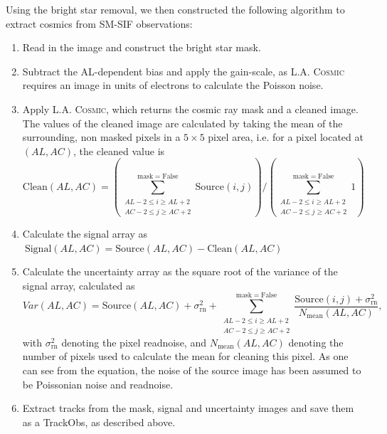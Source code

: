 \documentclass[a4paper, 11pt]{article}
\begin{document}
Using the bright star removal, we then constructed the following algorithm to extract cosmics from SM-SIF observations:
\begin{enumerate}
  \item Read in the image and construct the bright star mask.
  \item Subtract the AL-dependent bias and apply the gain-scale, as \textsc{L.A. Cosmic} requires an image in units of electrons to calculate the Poisson noise.
  \item Apply \textsc{L.A. Cosmic}, which returns the cosmic ray mask and a cleaned image. The values of the cleaned image are calculated by taking the mean of the surrounding, non masked pixels in a $5 \times 5$ pixel area, i.e. for a pixel located at $\left(AL,AC\right)$, the cleaned value is
    \begin{equation}
      \mathrm{Clean}\left(AL,AC\right) = \left( \sum\limits^\mathrm{mask=False}_{\substack{AL-2 \leq i \geq AL+2 \\ AC-2 \leq j \geq AC+2}} \mathrm{Source}\left( i, j \right) \right) \bigg/ \left( \sum\limits^\mathrm{mask=False}_{\substack{AL-2 \leq i \geq AL+2 \\ AC-2 \leq j \geq AC+2}} 1\right)
    \end{equation}
  \item Calculate the signal array as $~\mathrm{Signal}\left(AL, AC\right)= \mathrm{Source}\left(AL, AC\right) - \mathrm{Clean}\left(AL, AC\right)$
  \item Calculate the uncertainty array as the square root of the variance of the signal array, calculated as
    \begin{equation}
      Var\left(AL,AC\right) = \mathrm{Source}\left(AL,AC\right) + \sigma_\mathrm{rn}^2 + \sum\limits^\mathrm{mask=False}_{\substack{AL-2 \leq i \geq AL+2 \\ AC-2 \leq j \geq AC+2}} \frac{\mathrm{Source}\left(i,j\right) + \sigma_\mathrm{rn}^2}{N_\mathrm{mean}\left(AL,AC\right)},
    \end{equation}
    with $\sigma_\mathrm{rn}^2$ denoting the pixel readnoise, and $N_\mathrm{mean}\left(AL,AC\right)$ denoting the number of pixels used to calculate the mean for cleaning this pixel. As one can see from the equation, the noise of the source image has been assumed to be Poissonian noise and readnoise.
  \item Extract tracks from the mask, signal and uncertainty images and save them as a TrackObs, as described above.
    
\end{enumerate}
\end{document}
